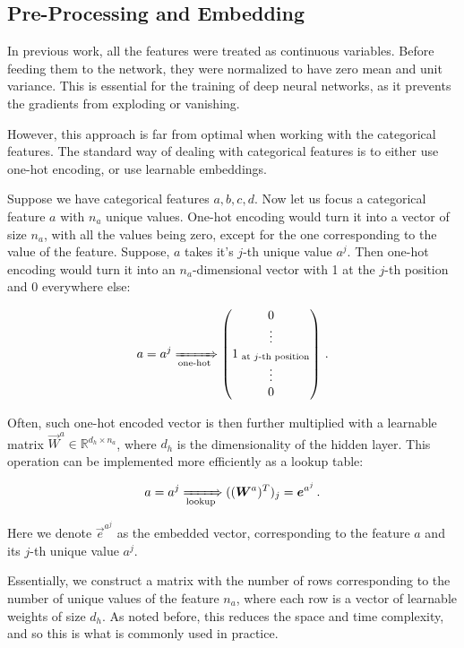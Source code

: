 \subsection{Pre-Processing and Embedding}


In previous work, all the features were treated as continuous variables. Before feeding them to the network, they were
normalized to have zero mean and unit variance. This is essential for the training of deep neural networks, as it
prevents the gradients from exploding or vanishing.

However, this approach is far from optimal when working with the categorical features. The standard way of dealing with
categorical features is to either use one-hot encoding, or use learnable embeddings.

Suppose we have categorical features $a, b, c, d$. Now let us focus a categorical feature $a$ with $n_a$ unique values.
One-hot encoding would turn it into a vector of size $n_a$, with all the values being zero, except for the one
corresponding to the value of the feature. Suppose, $a$ takes it's $j$-th unique value $a^j$. Then one-hot encoding
would turn it into an $n_a$-dimensional vector with 1 at the $j$-th position and 0 everywhere else:

\begin{equation}
    a = a^j \xRightarrow[\text{one-hot}]{} \begin{pmatrix}
        0 \\ \vdots \\ 1_\text{ at  $j$-th position} \\ \vdots \\ 0
    \end{pmatrix}\,.
\end{equation}


Often, such one-hot encoded vector is then further multiplied with a learnable matrix $\vec{W}^a \in \mathbb{R}^{d_h
        \times n_a}$, where $d_h$ is the dimensionality of the hidden layer. This operation can be implemented more
efficiently as a lookup table:

\begin{equation}
    a = a^j \xRightarrow[\text{lookup}]{} ((\vec{W}^a)^T)_j = \vec{e}^{a^j}\,.
\end{equation}

Here we denote $\vec{e}^{a^j}$ as the embedded vector, corresponding to the feature $a$ and its $j$-th unique value
$a^j$.

Essentially, we construct a matrix with the number of rows corresponding to the number of unique values of the feature
$n_a$, where each row is a vector of learnable weights of size $d_h$. As noted before, this reduces the space and time
complexity, and so this is what is commonly used in practice.

